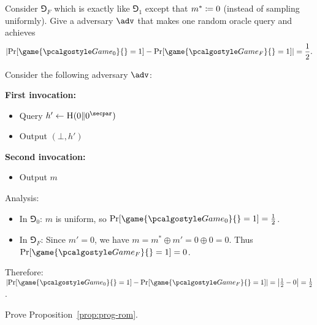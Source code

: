 \begin{exercise}
  Consider $\Game_F$ which is exactly like $\Game_1$ except that $m^* \coloneq 0$ (instead of sampling uniformly). Give a \ppt adversary $\adv$ that makes one random oracle query and achieves
  \[
    \left|\Pr[\game{\Game_0}{} = 1] - \Pr[\game{\Game_F}{} = 1]\right| = \frac{1}{2}.
  \]
\end{exercise}

\ifsolutions
\begin{mysolution}
  Consider the following adversary $\adv$:
  
  \textbf{First invocation:}
  \begin{itemize}
    \item Query $h' \gets \pcoracle{H}(0 \| 0^\secpar)$
    \item Output $(\bot, h')$
  \end{itemize}
  
  \textbf{Second invocation:}
  \begin{itemize}
    \item Output $m$
  \end{itemize}
  
  Analysis:
  \begin{itemize}
    \item In $\Game_0$: $m$ is uniform, so $\Pr[\game{\Game_0}{} = 1] = \frac{1}{2}$.
    \item In $\Game_F$: Since $m' = 0$, we have $m = m^* \oplus m' = 0 \oplus 0 = 0$. Thus $\Pr[\game{\Game_F}{} = 1] = 0$.
  \end{itemize}
  
  Therefore: $\left|\Pr[\game{\Game_0}{} = 1] - \Pr[\game{\Game_F}{} = 1]\right| = \left|\frac{1}{2} - 0\right| = \frac{1}{2}$.
\end{mysolution}
\fi

\begin{exercise}
  Prove Proposition~\ref{prop:prog-rom}.
\end{exercise}


